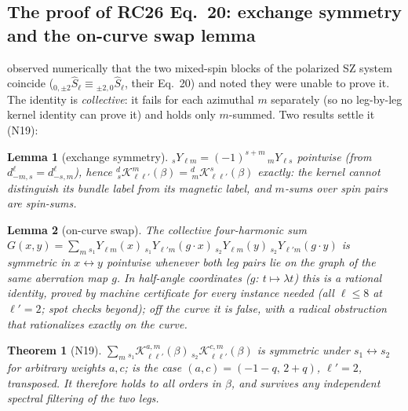 \documentclass[useAMS,usenatbib]{article}
\newcommand{\Kk}{\mathcal{K}}
\newtheorem{theorem}{Theorem}
\newtheorem{lemma}{Lemma}
\begin{document}
\subsection{The proof of RC26 Eq.~20: exchange symmetry and the on-curve swap lemma}\label{sec:eq20}
\citet{RC26} observed numerically that the two mixed-spin blocks of the polarized SZ system coincide
(${}_{0,\pm2}\hat S_\ell \equiv {}_{\pm2,0}\hat S_\ell$, their Eq.~20) and noted they were unable to prove it.
The identity is \emph{collective}: it fails for each azimuthal $m$ separately (so no leg-by-leg kernel identity
can prove it) and holds only $m$-summed. Two results settle it (N19):
\begin{lemma}[exchange symmetry]
${}_sY_{\ell m} = (-1)^{s+m}\,{}_mY_{\ell s}$ pointwise (from $d^\ell_{-m,s} = d^\ell_{-s,m}$), hence
${}^{d}_{\,s}\Kk^{m}_{\ell\ell'}(\beta) = {}^{d}_{\,m}\Kk^{s}_{\ell\ell'}(\beta)$ exactly: the kernel cannot
distinguish its bundle label from its magnetic label, and $m$-sums over spin pairs \emph{are} spin-sums.
\end{lemma}
\begin{lemma}[on-curve swap]
The collective four-harmonic sum
$G(x,y) = \sum_m {}_{s_1}Y_{\ell m}(x)\,{}_{s_1}Y_{\ell'm}(g\!\cdot\!x)\,{}_{s_2}Y_{\ell m}(y)\,{}_{s_2}Y_{\ell'm}(g\!\cdot\!y)$
is symmetric in $x\leftrightarrow y$ \emph{pointwise} whenever both leg pairs lie on the graph of the same
aberration map $g$. In half-angle coordinates ($g$: $t\mapsto\lambda t$) this is a rational identity, proved by
machine certificate for every instance needed (all $\ell\le8$ at $\ell'=2$; spot checks beyond); off the curve
it is false, with a radical obstruction that rationalizes exactly on the curve.
\end{lemma}
\begin{theorem}[N19]
$\sum_m {}_{s_1}\Kk^{a,m}_{\ell\ell'}(\beta)\,{}_{s_2}\Kk^{c,m}_{\ell\ell'}(\beta)$ is symmetric under
$s_1\leftrightarrow s_2$ for arbitrary weights $a,c$; \citet[Eq.~20]{RC26} is the case
$(a,c) = (-1-q,\,2+q)$, $\ell'=2$, transposed. It therefore holds to all orders in $\beta$, and survives any
independent spectral filtering of the two legs.
\end{theorem}
\end{document}
